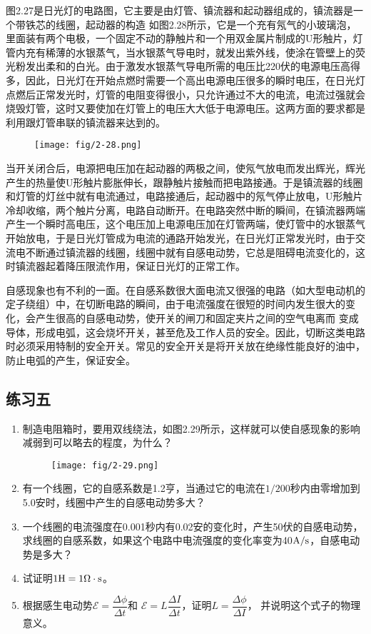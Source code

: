 图2.27是日光灯的电路图，它主要是由灯管、镇流器和起动器组成的，镇流器是一个带铁芯的线圈，起动器的构造
如图2.28所示，它是一个充有氖气的小玻璃泡，里面装有两个电极，一个固定不动的静触片和一个用双金属片制成的U形触片，灯管内充有稀薄的水银蒸气，当水银蒸气导电时，就发出紫外线，使涂在管壁上的荧光粉发出柔和的白光。由于激发水银蒸气导电所需的电压比220伏的电源电压高得多，因此，日光灯在开始点燃时需要一个高出电源电压很多的瞬时电压，在日光灯点燃后正常发光时，灯管的电阻变得很小，只允许通过不大的电流，电流过强就会烧毁灯管，这时又要使加在灯管上的电压大大低于电源电压。这两方面的要求都是利用跟灯管串联的镇流器来达到的。
\begin{figure}[htp]\centering
\texttt{[image: fig/2-28.png]}
\caption{}
\end{figure}

当开关闭合后，电源把电压加在起动器的两极之间，使氖气放电而发出辉光，辉光产生的热量使U形触片膨胀伸长，跟静触片接触而把电路接通。于是镇流器的线圈和灯管的灯丝中就有电流通过，电路接通后，起动器中的氖气停止放电，U形触片冷却收缩，两个触片分离，电路自动断开。在电路突然中断的瞬间，在镇流器两端产生一个瞬时高电压，这个电压加上电源电压加在灯管两端，使灯管中的水银蒸气开始放电，于是日光灯管成为电流的通路开始发光，在日光灯正常发光时，由于交流电不断通过镇流器的线圈，线圈中就有自感电动势，它总是阻碍电流变化的，这时镇流器起着降压限流作用，保证日光灯的正常工作。

自感现象也有不利的一面。在自感系数很大面电流又很强的电路（如大型电动机的定子绕组）中，在切断电路的瞬间，由于电流强度在很短的时间内发生很大的变化，会产生很高的自感电动势，使开关的闸刀和固定夹片之间的空气电离而
变成导体，形成电弧，这会烧坏开关，甚至危及工作人员的安全。因此，切断这类电路时必须采用特制的安全开关。常见的安全开关是将开关放在绝缘性能良好的油中，防止电弧的产生，保证安全。

\subsection*{练习五}
\begin{enumerate}
    \item 制造电阻箱时，要用双线绕法，如图2.29所示，这样就可以使自感现象的影响减弱到可以略去的程度，为什么？
    \begin{figure}[htp]\centering
\texttt{[image: fig/2-29.png]}
\caption{}
\end{figure}

    \item 有一个线圈，它的自感系数是1.2亨，当通过它的电流在$1/200$秒内由零增加到5.0安时，线圈中产生的自感电动势多大？
    \item 一个线圈的电流强度在0.001秒内有0.02安的变化时，产生50伏的自感电动势，求线圈的自感系数，如果这个电路中电流强度的变化率变为40${\rm A}/{\rm s}$，自感电动势是多大？
    \item 试证明$1{\rm H}=1\Omega\cdot {\rm s}$。
    \item 根据感生电动势$\mathcal{E}=\dfrac{\Delta \phi}{\Delta t}$和 $\mathcal{E}=L\dfrac{\Delta I}{\Delta t}$，证明$L=\dfrac{\Delta \phi}{\Delta I}$，
    并说明这个式子的物理意义。
\end{enumerate}

